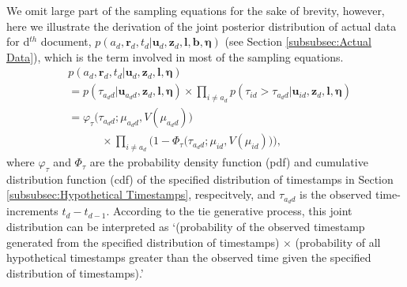 \documentclass[twoside]{article}
\begin{document}
   We omit large part of the sampling equations for the sake of brevity, however, here we illustrate the derivation of the joint posterior distribution of actual data for d$^{th}$ document, $p(a_d, \boldsymbol{r}_d, t_d|\boldsymbol{u}_{d}, \boldsymbol{z}_d,\boldsymbol{l}, \boldsymbol{b}, \boldsymbol{\eta})$ (see Section \ref{subsubsec:Actual Data}), which is the term involved in most of the sampling equations. 
  \begin{equation*}
  \begin{aligned}
  &p(a_d, \boldsymbol{r}_d, t_d|\boldsymbol{u}_{d}, \boldsymbol{z}_d,\boldsymbol{l}, \boldsymbol{\eta}) \\&= p(\tau_{a_d d}|\boldsymbol{u}_{a_dd},\boldsymbol{z}_d,\boldsymbol{l}, \boldsymbol{\eta})\times \prod_{i\neq a_d} p(\tau_{id} >\tau_{a_d d}|\boldsymbol{u}_{id},\boldsymbol{z}_d,\boldsymbol{l}, \boldsymbol{\eta}) \\& 
  = \varphi_{\tau}\big(\tau_{a_d d}; \mu_{a_d d}, V(\mu_{a_d d})\big)\\&\quad\quad\quad \times  \prod_{i\neq a_d}\Big(1-\Phi_{\tau} \big(\tau_{a_d d}; \mu_{i d}, V(\mu_{i d})\big) \Big),
  \end{aligned}
    \label{eqn:tieposterior}
\end{equation*}  
  where $\varphi_\tau$ and $\Phi_\tau$ are the probability density function (pdf) and cumulative distribution function (cdf) of the specified distribution of timestamps in Section \ref{subsubsec:Hypothetical Timestamps}, respecitvely, and $\tau_{a_d d}$ is the observed time-increments $t_d - t_{d-1}$. According to the tie generative process, this joint distribution can be interpreted as `(probability of the observed timestamp generated from the specified distribution of timestamps) $\times$ (probability of all hypothetical timestamps greater than the observed time given the specified distribution of timestamps).' 
 
\end{document}
